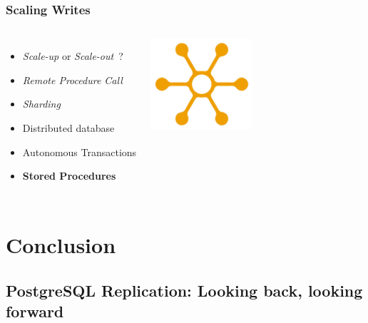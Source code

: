 \documentclass[english]{beamer}
\begin{document}
\begin{frame}[fragile]
  \frametitle{Scaling Writes}

  \linebreak
  \linebreak

\begin{columns}[c]

  \begin{itemize}
   \item<1-> \textit{Scale-up} or \textit{Scale-out} ?
   \item<2-> \textit{Remote Procedure Call}
   \item<3-> \textit{Sharding}
   \item<3-> Distributed database
   \item<4-> Autonomous Transactions
   \item<5-> \textbf{Stored Procedures}
  \end{itemize}  

\includegraphics[height=9em]{distribution.jpg}
\end{columns}
\end{frame}



\section{Conclusion}
\subsection{PostgreSQL Replication: Looking back, looking forward}
\frame{\tableofcontents[currentsubsection]}
\end{document}
